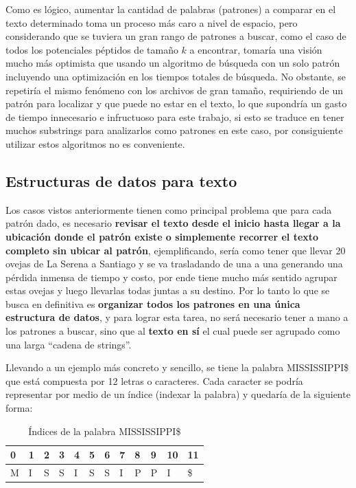 Como es lógico, aumentar la cantidad de palabras (patrones) a comparar en el texto determinado toma un proceso más caro a nivel de espacio, pero considerando que se tuviera un gran rango de patrones a buscar, como el caso de todos los potenciales péptidos de tamaño $k$ a encontrar, tomaría una visión mucho más optimista que usando un algoritmo de búsqueda con un solo patrón incluyendo una optimización en los tiempos totales de búsqueda. No obstante, se repetiría el mismo fenómeno con los archivos de gran tamaño, requiriendo de un patrón para localizar y que puede no estar en el texto, lo que supondría un gasto de tiempo innecesario e infructuoso para este trabajo, si esto se traduce en tener muchos substrings para analizarlos como patrones en este caso, por consiguiente utilizar estos algoritmos no es conveniente.



\subsection{Estructuras de datos para texto}

Los casos vistos anteriormente tienen como principal problema que para cada patrón dado, es necesario \textbf{revisar el texto desde el inicio hasta llegar a la ubicación donde el patrón existe o simplemente recorrer el texto completo sin ubicar al patrón}, ejemplificando, sería como tener que llevar 20 ovejas de La Serena a Santiago y se va trasladando de una a una generando una pérdida inmensa de tiempo y costo, por ende tiene mucho más sentido agrupar estas ovejas y luego llevarlas todas juntas a su destino. Por lo tanto lo que se busca en definitiva es \textbf{organizar todos los patrones en una única estructura de datos}, y para lograr esta tarea, no será necesario tener a mano a los patrones a buscar, sino que al \textbf{texto en sí} el cual puede ser agrupado como una larga ``cadena de strings''.

Llevando a un ejemplo más concreto y sencillo, se tiene la palabra MISSISSIPPI\$ que está compuesta por 12 letras o caracteres. Cada caracter se podría representar por medio de un índice (indexar la palabra) y quedaría de la siguiente forma:

\begin{table}[h]
\centering
\begin{tabular}{llllllllllll}
0                       & 1                      & 2                      & 3                      & 4                      & 5                      & 6                      & 7                      & 8                      & 9                      & 10                     & 11                     \\ \hline
\multicolumn{1}{|l|}{M} & \multicolumn{1}{l|}{I} & \multicolumn{1}{l|}{S} & \multicolumn{1}{l|}{S} & \multicolumn{1}{l|}{I} & \multicolumn{1}{l|}{S} & \multicolumn{1}{l|}{S} & \multicolumn{1}{l|}{I} & \multicolumn{1}{l|}{P} & \multicolumn{1}{l|}{P} & \multicolumn{1}{l|}{I} & \multicolumn{1}{l|}{\$} \\ \hline
\end{tabular}
\caption{Índices de la palabra MISSISSIPPI\$}
\end{table}

